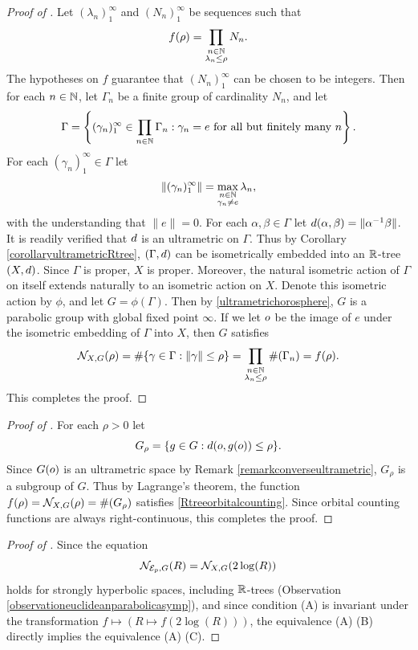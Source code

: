 \begin{proof}[Proof of ]
Let $(\lambda_n)_1^\infty$ and $(N_n)_1^\infty$ be sequences such that
\[
f(\rho) = \prod_{\substack{n\in\N \\ \lambda_n \leq \rho}} N_n.
\]
The hypotheses on $f$ guarantee that $(N_n)_1^\infty$ can be chosen to be integers. Then for each $n\in\N$, let $\Gamma_n$ be a finite group of cardinality $N_n$, and let
\[
\Gamma%
= \left\{(\gamma_n)_1^\infty \in \prod_{n\in\N} \Gamma_n : \gamma_n = e \text{ for all but finitely many $n$}\right\}.
\]
For each $(\gamma_n)_1^\infty \in \Gamma$ let
\begin{equation}
\label{infinitecoproduct}
\|(\gamma_n)_1^\infty\| = \max_{\substack{n\in\N \\ \gamma_n\neq e}} \lambda_n,
\end{equation}
with the understanding that $\|e\| = 0$. For each $\alpha,\beta\in \Gamma$ let $d(\alpha,\beta) = \|\alpha^{-1} \beta\|$. It is readily verified that $d$ is an ultrametric on $\Gamma$. Thus by Corollary \ref{corollaryultrametricRtree}, $(\Gamma,d)$ can be isometrically embedded into an $\R$-tree $(X,d)$. Since $\Gamma$ is proper, $X$ is proper. Moreover, the natural isometric action of $\Gamma$ on itself extends naturally to an isometric action on $X$. Denote this isometric action by $\phi$, and let $G = \phi(\Gamma)$. Then by \eqref{ultrametrichorosphere}, $G$ is a parabolic group with global fixed point $\infty$. If we let $o$ be the image of $e$ under the isometric embedding of $\Gamma$ into $X$, then $G$ satisfies
\[
\NN_{X,G}(\rho) = \#\{\gamma\in \Gamma : \|\gamma\| \leq \rho\} = \prod_{\substack{n\in\N \\ \lambda_n\leq \rho}} \#(\Gamma_n) = f(\rho).
\]
This completes the proof.
\end{proof}
\begin{proof}[Proof of ]
For each $\rho > 0$ let
\[
G_\rho = \{g\in G : d(o,g(o)) \leq \rho\}.
\]
Since $G(o)$ is an ultrametric space by Remark \ref{remarkconverseultrametric}, $G_\rho$ is a subgroup of $G$. Thus by Lagrange's theorem, the function $f(\rho) = \mathcal N_{X,G}(\rho) = \#(G_\rho)$ satisfies \eqref{Rtreeorbitalcounting}. Since orbital counting functions are always right-continuous, this completes the proof.
\end{proof}
\begin{proof}[Proof of ]
Since the equation
\[
\mathcal N_{\mathcal E_p,G}(R) = \mathcal N_{X,G}(2\log(R))
\]
holds for strongly hyperbolic spaces, including $\R$-trees (Observation \ref{observationeuclideanparabolicasymp}), and since condition (A) is invariant under the transformation $f\mapsto (R\mapsto f(2\log(R)))$, the equivalence (A) \iff (B) directly implies the equivalence (A) \iff (C).
\end{proof}

